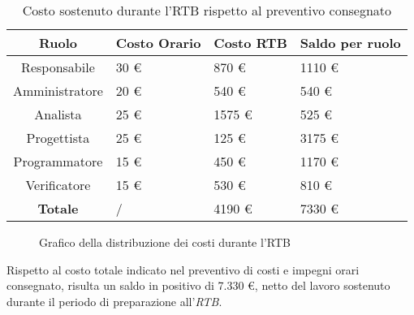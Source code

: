 \newpage
{} 
\begin{table}[h!]
    \centering
    \renewcommand{\arraystretch}{1.5}
    \begin{tabularx}{\textwidth}{|c|X|X|X|}
        \hline
        \rowcolor[HTML]{FFD700} 
        \textbf{Ruolo} & \textbf{Costo Orario} & \textbf{Costo RTB} & \textbf{Saldo per ruolo} \\
        \hline
        Responsabile & 30 \euro & 870 \euro & 1110 \euro \\
        \hline
        Amministratore & 20 \euro & 540 \euro & 540 \euro \\
        \hline
        Analista & 25 \euro & 1575 \euro & 525 \euro \\
        \hline
        Progettista & 25 \euro & 125 \euro & 3175 \euro \\
        \hline
        Programmatore & 15 \euro & 450 \euro & 1170 \euro \\
        \hline
        Verificatore & 15 \euro & 530 \euro & 810 \euro \\
        \hline
        \rowcolor[HTML]{FFD700} 
        \textbf{Totale} & / & 4190 \euro & 7330 \euro \\
        \hline
    \end{tabularx}
    \caption{Costo sostenuto durante l’RTB rispetto al preventivo consegnato}
\end{table}

\begin{figure}[htbp]
    \centering
    \caption{Grafico della distribuzione dei costi durante l’RTB}
\end{figure}

Rispetto al costo totale indicato nel preventivo di costi e impegni orari consegnato, risulta un saldo in positivo di 7.330 \euro, netto del lavoro sostenuto durante il periodo di preparazione all’\emph{RTB}.

